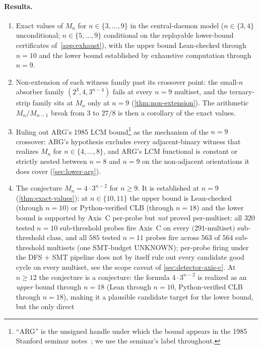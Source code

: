 \documentclass[11pt,a4paper]{article}
\theoremstyle{plain}
\theoremstyle{definition}
\newcommand{\Mn}{M_n}
\begin{document}
\paragraph{Results.}
\begin{enumerate}[leftmargin=*]
\item Exact values of $\Mn$ for $n \in \{3, \ldots, 9\}$ in the
central-daemon model ($n \in \{3, 4\}$ unconditional; $n \in \{5,
\ldots, 9\}$ conditional on the replayable lower-bound certificates
of~\cref{app:exhaust}), with the upper bound Lean-checked through
$n = 10$ and the lower bound established by exhaustive computation
through $n = 9$.
\item Non-extension of each witness family past its crossover
point: the small-$n$ absorber family $(2^3, 4, 3^{n-4})$ fails at
every $n = 9$ multiset, and the ternary-strip family sits at
$\Mn$ only at $n = 9$ (\cref{thm:non-extension}).  The arithmetic
$\Mn / M_{n-1}$ break from $3$ to $27/8$ is then a corollary of
the exact values.
\item Ruling out ARG's 1985 LCM bound\footnote{``ARG'' is the
unsigned handle under which the bound appears in the 1985 Stanford
seminar notes~\cite[\S2--\S3]{HaddadKnuth1985}; we use the
seminar's label throughout.} as the mechanism of the
$n = 9$ crossover: ARG's hypothesis excludes every adjacent-binary
witness that realizes $\Mn$ for $n \in \{4, \ldots, 8\}$, and ARG's
LCM functional is constant or strictly nested between $n = 8$ and
$n = 9$ on the non-adjacent orientations it does cover
(\cref{sec:lower-arg}).
\item The conjecture $\Mn = 4 \cdot 3^{n-2}$ for $n \ge 9$.  It is
established at $n = 9$ (\cref{thm:exact-values}); at $n \in \{10,
11\}$ the upper bound is Lean-checked (through $n = 10$) or
Python-verified CLB (through $n = 18$) and the lower bound is
supported by Axis~C per-probe but \emph{not} proved per-multiset:
all $320$ tested $n = 10$ sub-threshold probes fire Axis~C on
every $(291$-multiset$)$ sub-threshold class, and all $585$ tested
$n = 11$ probes fire across $563$ of $564$ sub-threshold
multisets (one SMT-budget UNKNOWN); per-probe firing under the
DFS $+$ SMT pipeline does not by itself rule out every candidate
good cycle on every multiset, see the scope caveat of
\cref{sec:detector-axis-c}.  At $n \ge 12$ the conjecture is a
conjecture: the formula $4 \cdot 3^{n-2}$ is realized as an
\emph{upper} bound through $n = 18$ (Lean through $n = 10$,
Python-verified CLB through $n = 18$), making it a plausible
candidate target for the lower bound, but the only direct

\end{enumerate}
\end{document}
